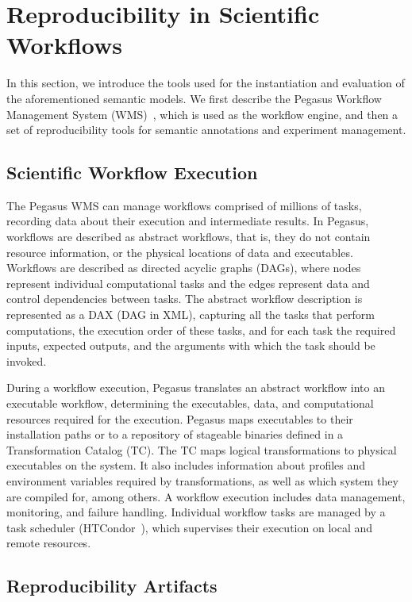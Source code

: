 \section{Reproducibility in Scientific Workflows}
\label{sec:reproducibility}

In this section, we introduce the tools used for the instantiation and evaluation 
of the aforementioned semantic models. We first describe the Pegasus Workflow 
Management System (WMS)~\cite{Deelman-FGCS-2014}, which is used as the 
workflow engine, and then a set of reproducibility tools for semantic annotations and 
experiment management.


\subsection{Scientific Workflow Execution}

The Pegasus WMS can manage workflows comprised of millions of tasks, recording data 
about their execution and intermediate results. In Pegasus, workflows are described as 
abstract workflows, that is, they do not contain resource information, or the physical locations of 
data and executables. Workflows are described as directed acyclic graphs (DAGs), where 
nodes represent individual computational tasks and the edges represent data and control 
dependencies between tasks. The abstract workflow description is represented as a DAX 
(DAG in XML), capturing all the tasks that perform computations, the execution order of these 
tasks, and for each task the required inputs, expected outputs, and the arguments with which 
the task should be invoked. 

During a workflow execution, Pegasus translates an abstract workflow into an 
executable workflow, determining the executables, data, and computational resources 
required for the execution. Pegasus maps executables to their installation paths or to a 
repository of stageable binaries defined in a Transformation Catalog (TC). 
The TC maps logical transformations to physical executables on the system. It also 
includes information about profiles and environment variables required by transformations,
as well as which system they are compiled for, among others. A workflow 
execution includes data management, monitoring, and failure handling. Individual workflow 
tasks are managed by a task scheduler (HTCondor~\cite{condor}), which supervises their 
execution on local and remote resources.


\subsection{Reproducibility Artifacts}

